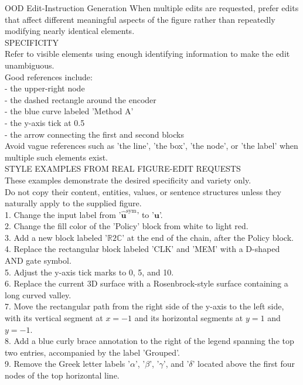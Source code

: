 \begin{PromptBox}{OOD Edit-Instruction Generation}
When multiple edits are requested, prefer edits that affect different meaningful aspects of the figure rather than repeatedly modifying nearly identical elements. \\

SPECIFICITY \\
Refer to visible elements using enough identifying information to make the edit unambiguous. \\

Good references include: \\
- the upper-right node \\
- the dashed rectangle around the encoder \\
- the blue curve labeled 'Method A' \\
- the y-axis tick at 0.5 \\
- the arrow connecting the first and second blocks \\

Avoid vague references such as 'the line', 'the box', 'the node', or 'the label' when multiple such elements exist. \\

STYLE EXAMPLES FROM REAL FIGURE-EDIT REQUESTS \\
These examples demonstrate the desired specificity and variety only. \\
Do not copy their content, entities, values, or sentence structures unless they naturally apply to the supplied figure. \\
1. Change the input label from
'$\hat{\boldsymbol{u}}^{\mathrm{sym}}$' to '$\boldsymbol{u}$'. \\
2. Change the fill color of the 'Policy' block from white to light red. \\
3. Add a new block labeled '$\mathbb{R}2\mathbb{C}$' at the end of the chain, after the Policy block. \\
4. Replace the rectangular block labeled 'CLK' and 'MEM' with a D-shaped AND gate symbol. \\
5. Adjust the y-axis tick marks to 0, 5, and 10. \\
6. Replace the current 3D surface with a Rosenbrock-style surface containing a long curved valley. \\
7. Move the rectangular path from the right side of the y-axis to the left side, with its vertical segment at $x=-1$ and its horizontal segments at $y=1$ and $y=-1$. \\
8. Add a blue curly brace annotation to the right of the legend spanning the top two entries, accompanied by the label 'Grouped'. \\
9. Remove the Greek letter labels '$\alpha$', '$\beta$', '$\gamma$', and '$\delta$' located above the first four nodes of the top horizontal line. \\


\end{PromptBox}

